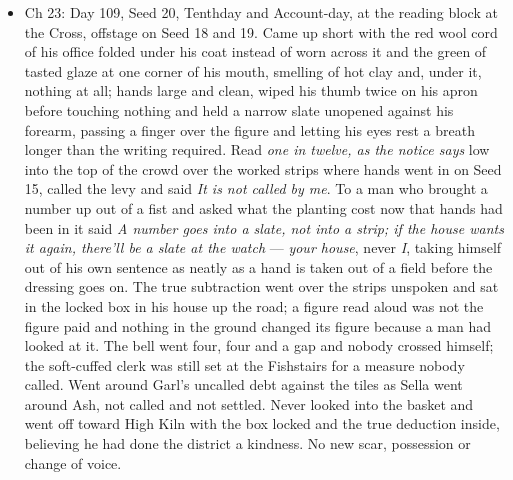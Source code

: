 \documentclass{design/chronicle}
\begin{document}
{\begin{itemize}[leftmargin=1.4em,itemsep=1pt,topsep=3pt,parsep=0pt]
\end{itemize}

\begin{itemize}[leftmargin=1.4em,itemsep=1pt,topsep=3pt,parsep=0pt]

\item Ch 23: Day 109, Seed 20, Tenthday and Account-day, at the reading block at the Cross, offstage on Seed 18 and 19. Came up short with the red wool cord of his office folded under his coat instead of worn across it and the green of tasted glaze at one corner of his mouth, smelling of hot clay and, under it, nothing at all; hands large and clean, wiped his thumb twice on his apron before touching nothing and held a narrow slate unopened against his forearm, passing a finger over the figure and letting his eyes rest a breath longer than the writing required. Read \emph{one in twelve, as the notice says} low into the top of the crowd over the worked strips where hands went in on Seed 15, called the levy and said \emph{It is not called by me}. To a man who brought a number up out of a fist and asked what the planting cost now that hands had been in it said \emph{A number goes into a slate, not into a strip; if the house wants it again, there’ll be a slate at the watch} — \emph{your house}, never \emph{I}, taking himself out of his own sentence as neatly as a hand is taken out of a field before the dressing goes on. The true subtraction went over the strips unspoken and sat in the locked box in his house up the road; a figure read aloud was not the figure paid and nothing in the ground changed its figure because a man had looked at it. The bell went four, four and a gap and nobody crossed himself; the soft-cuffed clerk was still set at the Fishstairs for a measure nobody called. Went around Garl’s uncalled debt against the tiles as Sella went around Ash, not called and not settled. Never looked into the basket and went off toward High Kiln with the box locked and the true deduction inside, believing he had done the district a kindness. No new scar, possession or change of voice.

\end{itemize}

\begin{itemize}[leftmargin=1.4em,itemsep=1pt,topsep=3pt,parsep=0pt]


\end{itemize}}
\end{document}
